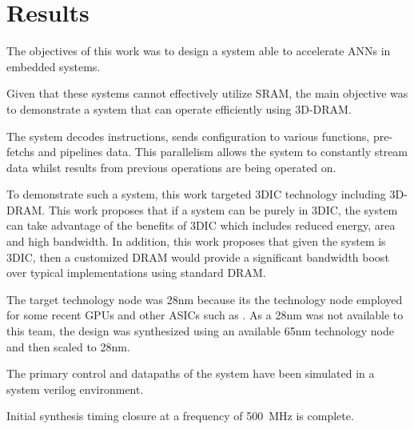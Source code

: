 
\chapter{Results}
\label{sec:Results}
The objectives of this work was to design a system able to accelerate ANNs in embedded systems.
\iffalse
This means systems that are not designed to process multiple requests of essentially the same operation.
\fi
Given that these systems cannot effectively utilize SRAM, the main objective was to demonstrate a system that can operate efficiently using 3D-DRAM.

The system decodes instructions, sends configuration to various functions, pre-fetchs and pipelines data.
This parallelism allows the system to constantly stream data whilst results from previous operations are being operated on.

To demonstrate such a system, this work targeted 3DIC technology including 3D-DRAM. This work proposes that if a system can be purely in 3DIC, the system can take advantage of the benefits
of 3DIC which includes reduced energy, area and high bandwidth.
In addition, this work proposes that given the system is 3DIC, then a customized DRAM would provide a significant bandwidth boost over typical implementations using standard DRAM.
\iffalse
To ensure the system was purely 3DIC, the area of the system Manager and Processing Engine has to stay within the physical footprint of the DRAM.
\fi

The target technology node was 28nm because its the technology node employed for some recent GPUs and other ASICs such as \cite{jouppi2017datacenter}.
As a 28nm was not available to this team, the design was synthesized using an available 65nm technology node and then scaled to 28nm.

The primary control and datapaths of the system have been simulated in a system verilog environment. 
\iffalse
It has been synthesized using a 65nm technology node.
\fi
Initial synthesis timing closure at a frequency of \SI{500}{\mega\hertz} is complete.

\iffalse
As mention previously \eqref{eq:averageBandwidth}, to process multiple useful sized ANNs requires a sustained bandwidth to the PE of the order of ten's of \SI[per-mode=symbol]{}{\tera\bit\per\second}.
\fi

